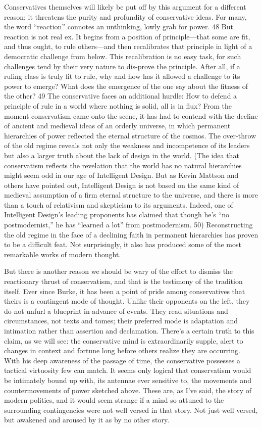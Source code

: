 Conservatives themselves will likely be put off by this argument for a different reason: it threatens the purity and profundity of conservative ideas. For many, the word “reaction” connotes an unthinking, lowly grab for power. {\color{blue}48} But reaction is not real ex. It begins from a position of principle—that some are fit, and thus ought, to rule others—and then recalibrates that principle in light of a democratic challenge from below. This recalibration is no easy task, for such challenges tend by their very nature to dis-prove the principle. After all, if a ruling class is truly fit to rule, why and how has it allowed a challenge to its power to emerge? What does the emergence of the one say about the fitness of the other? {\color{blue}49} The conservative faces an additional hurdle: How to defend a principle of rule in a world where nothing is solid, all is in flux? From the moment conservatism came onto the scene, it has had to contend with the decline of ancient and medieval ideas of an orderly universe, in which permanent hierarchies of power reflected the eternal structure of the cosmos. The over-throw of the old regime reveals not only the weakness and incompetence of its leaders but also a larger truth about the lack of design in the world. (The idea that conservatism reflects the revelation that the world has no natural hierarchies might seem odd in our age of Intelligent Design. But as Kevin Mattson and others have pointed out, Intelligent Design is not based on the same kind of medieval assumption of a firm eternal structure to the universe, and there is more than a touch of relativism and skepticism to its arguments. Indeed, one of Intelligent Design’s leading proponents has claimed that though he’s “no postmodernist,” he has “learned a lot” from postmodernism. {\color{blue}50}) Reconstructing the old regime in the face of a declining faith in permanent hierarchies has proven to be a difficult feat. Not surprisingly, it also has produced some of the most remarkable works of modern thought.
 \par 
But there is another reason we should be wary of the effort to dismiss the reactionary thrust of conservatism, and that is the testimony of the tradition itself. Ever since Burke, it has been a point of pride among conservatives that theirs is a contingent mode of thought. Unlike their opponents on the left, they do not unfurl a blueprint in advance of events. They read situations and circumstances, not texts and tomes; their preferred mode is adaptation and intimation rather than assertion and declamation. There’s a certain truth to this claim, as we will see: the conservative mind is extraordinarily supple, alert to changes in context and fortune long before others realize they are occurring. With his deep awareness of the passage of time, the conservative possesses a tactical virtuosity few can match. It seems only logical that conservatism would be intimately bound up with, its antennae ever sensitive to, the movements and countermovements of power sketched above. These are, as I’ve said, the story of modern politics, and it would seem strange if a mind so attuned to the surrounding contingencies were not well versed in that story. Not just well versed, but awakened and aroused by it as by no other story.
